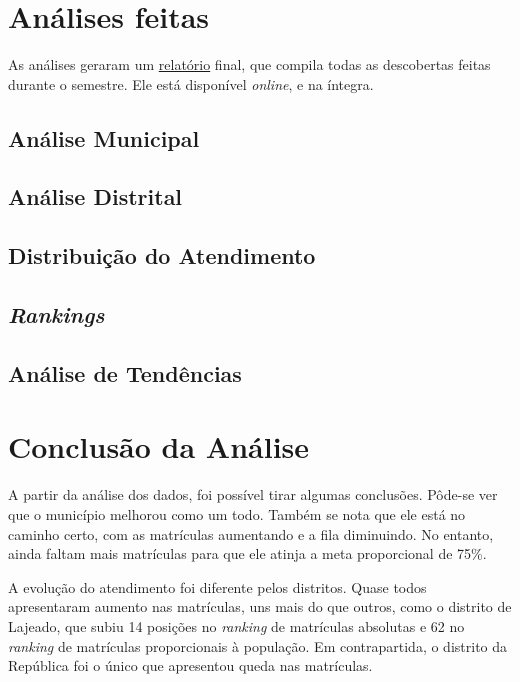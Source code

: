 \documentclass[12pt, a4paper]{article}
\begin{document}
\section{Análises feitas}

As análises geraram um \href{https://lsflp.github.io/MAC0213/relatorios/relatorio.pdf}{relatório} final, que compila todas as descobertas feitas durante o semestre. Ele está disponível \textit{online}, e na íntegra.

\subsection{Análise Municipal}

\subsection{Análise Distrital}

\subsection{Distribuição do Atendimento}

\subsection{\textit{Rankings}}

\subsection{Análise de Tendências}

\section{Conclusão da Análise}

A partir da análise dos dados, foi possível tirar algumas conclusões. Pôde-se ver que o município melhorou como um todo. Também se nota que ele está no caminho certo, com as matrículas aumentando e a fila diminuindo. No entanto, ainda faltam mais matrículas para que ele atinja a meta proporcional de 75\%.

A evolução do atendimento foi diferente pelos distritos. Quase todos apresentaram aumento nas matrículas, uns mais do que outros, como o distrito de Lajeado, que subiu 14 posições no \textit{ranking} de matrículas absolutas e 62 no \textit{ranking} de matrículas proporcionais à população. Em contrapartida, o distrito da República foi o único que apresentou queda nas matrículas.
\end{document}
